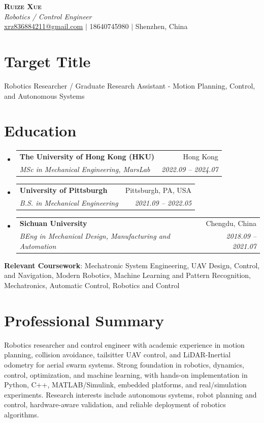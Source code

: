 \documentclass[letterpaper,11pt]{article}
\makeatletter
\newcommand{\resumeSubheading}[4]{
  \vspace{-2pt}\item
    \begin{tabular*}{0.97\textwidth}[t]{l@{\extracolsep{\fill}}r}
      \textbf{#1} & #2 \\
      \textit{\small#3} & \textit{\small #4} \\
    \end{tabular*}\vspace{-7pt}
}
\newcommand{\resumeSubHeadingListStart}{\begin{itemize}[leftmargin=0.15in, label={}]}
\newcommand{\resumeSubHeadingListEnd}{\end{itemize}}
\makeatother
\begin{document}
\begin{center}
    \textbf{\Huge \scshape Ruize Xue} \\ \vspace{1pt}
    \small \textit{Robotics / Control Engineer} \\
    \href{mailto:xrz836884211@gmail.com}{\underline{xrz836884211@gmail.com}} $|$
    18640745980 $|$
    Shenzhen, China
\end{center}

\section{Target Title}
\small{Robotics Researcher / Graduate Research Assistant - Motion Planning, Control, and Autonomous Systems}

\section{Education}
  \resumeSubHeadingListStart
    \resumeSubheading
      {The University of Hong Kong (HKU)}{Hong Kong}
      {MSc in Mechanical Engineering, MarsLab}{2022.09 -- 2024.07}
    \resumeSubheading
      {University of Pittsburgh}{Pittsburgh, PA, USA}
      {B.S. in Mechanical Engineering}{2021.09 -- 2022.05}
    \resumeSubheading
      {Sichuan University}{Chengdu, China}
      {BEng in Mechanical Design, Manufacturing and Automation}{2018.09 -- 2021.07}
  \resumeSubHeadingListEnd
  \begin{itemize}[leftmargin=0.15in, label={}]
    \small{\item{
      \textbf{Relevant Coursework}{: Mechatronic System Engineering, UAV Design, Control, and Navigation, Modern Robotics, Machine Learning and Pattern Recognition, Mechatronics, Automatic Control, Robotics and Control}
    }}
  \end{itemize}

\section{Professional Summary}
\small{
Robotics researcher and control engineer with academic experience in motion planning, collision avoidance, tailsitter UAV control, and LiDAR-Inertial odometry for aerial swarm systems. Strong foundation in robotics, dynamics, control, optimization, and machine learning, with hands-on implementation in Python, C++, MATLAB/Simulink, embedded platforms, and real/simulation experiments. Research interests include autonomous systems, robot planning and control, hardware-aware validation, and reliable deployment of robotics algorithms.
}
\end{document}
